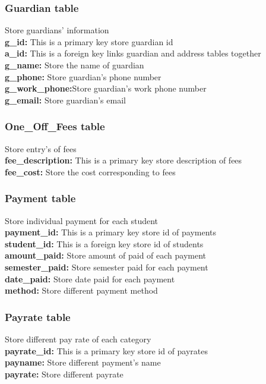 \subsubsection{Guardian table}
Store guardians' information\\
\textbf{g\_id:} This is a primary key store guardian id\\
\textbf{a\_id:} This is a foreign key links guardian and address tables together\\
\textbf{g\_name:} Store the name of guardian\\
\textbf{g\_phone:} Store guardian's phone number \\
\textbf{g\_work\_phone:}Store guardian's work phone number\\
\textbf{g\_email:} Store guardian's email

\subsubsection{One\_Off\_Fees table}
Store entry's of fees\\
\textbf{fee\_description:} This is a primary key store description of fees\\
\textbf{fee\_cost:} Store the cost corresponding to fees\\

\subsubsection{Payment table}
Store individual payment for each student \\
\textbf{payment\_id:} This is a primary key store id of payments\\
\textbf{student\_id:} This is a foreign key store id of students\\
\textbf{amount\_paid:} Store amount of paid of each payment\\
\textbf{semester\_paid:} Store semester paid for each payment\\
\textbf{date\_paid:} Store date paid for each payment\\
\textbf{method:} Store different payment method\\

\subsubsection{Payrate table}
Store different pay rate of each category\\
\textbf{payrate\_id:} This is a primary key store id of payrates\\
\textbf{payname:} Store different payment's name\\
\textbf{payrate:} Store different payrate\\


